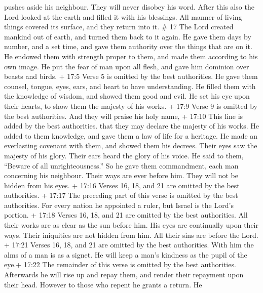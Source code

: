 pushes aside his neighbour. They will never disobey his word.
 After this also the Lord looked at the earth and filled it
with his blessings.  All manner of living things covered
its surface, and they return into it. \# 17  The Lord
created mankind out of earth, and turned them back to it again.
 He gave them days by number, and a set time, and gave them
authority over the things that are on it.  He endowed them
with strength proper to them, and made them according to his own image.
 He put the fear of man upon all flesh, and gave him
dominion over beasts and birds.  + 17:5 Verse 5 is omitted
by the best authorities.  He gave them counsel, tongue,
eyes, ears, and heart to have understanding.  He filled them
with the knowledge of wisdom, and showed them good and evil.
 He set his eye upon their hearts, to show them the majesty
of his works.  + 17:9 Verse 9 is omitted by the best
authorities.  And they will praise his holy name, + 17:10
This line is added by the best authorities. that they may declare the
majesty of his works.  He added to them knowledge, and gave
them a law of life for a heritage.  He made an everlasting
covenant with them, and showed them his decrees.  Their
eyes saw the majesty of his glory. Their ears heard the glory of his
voice.  He said to them, ``Beware of all unrighteousness.''
So he gave them commandment, each man concerning his neighbour.
 Their ways are ever before him. They will not be hidden
from his eyes.  + 17:16 Verses 16, 18, and 21 are omitted
by the best authorities.  + 17:17 The preceding part of
this verse is omitted by the best authorities. For every nation he
appointed a ruler, but Israel is the Lord's portion.  +
17:18 Verses 16, 18, and 21 are omitted by the best authorities.
 All their works are as clear as the sun before him. His
eyes are continually upon their ways.  Their iniquities are
not hidden from him. All their sins are before the Lord.  +
17:21 Verses 16, 18, and 21 are omitted by the best authorities.
 With him the alms of a man is as a signet. He will keep a
man's kindness as the pupil of the eye.+ 17:22 The remainder of this
verse is omitted by the best authorities.  Afterwards he
will rise up and repay them, and render their repayment upon their head.
 However to those who repent he grants a return. He
